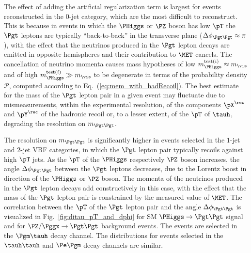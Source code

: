 The effect of adding the artificial regularization term is largest for events reconstructed in the $0$-jet category,
which are the most difficult to reconstruct.
This is because in events in which the $\PHiggs$ or $\PZ$ boson has low $\pT$
the $\Pgt$ leptons are typically ``back-to-back'' in the transverse plane ($\Delta\phi_{\Pgt\Pgt} \approx \pi$), 
with the effect that the neutrinos produced in the $\Pgt$ lepton decays are emitted in opposite hemispheres and their contribution to $\MET$ cancels.
The cancellation of neutrino momenta causes mass hypotheses of low $m_{\PHiggs}^{\textrm{test}(i)} \approx m_{\vis}$
and of high $m_{\PHiggs}^{\textrm{test}(i)} \gg m_{\vis}$
to be degenerate in terms of the probability density $\mathcal{P}$,
computed according to Eq.~(\ref{eq:mem_with_hadRecoil}).
The best estimate for the mass of the $\Pgt$ lepton pair in a given event may fluctuate 
due to mismeasurements, within the experimental resolution, of the components $\pX^{\rec}$ and $\pY^{\rec}$ of the hadronic recoil or, to a lesser extent, of the $\pT$ of $\tauh$,
degrading the resolution on $m_{\Pgt\Pgt}$.

The resolution on $m_{\Pgt\Pgt}$ is significantly higher 
in events selected in the $1$-jet and $2$-jet VBF categories,
in which the $\Pgt$ lepton pair typically recoils against high $\pT$ jets.
As the $\pT$ of the $\PHiggs$ respectively $\PZ$ boson increases,
the angle $\Delta\phi_{\Pgt\Pgt}$ between the $\Pgt$ leptons decreases, due to the Lorentz boost in direction of the $\PHiggs$ or $\PZ$ boson.
The momenta of the neutrinos produced in the $\Pgt$ lepton decays add constructively in this case,
with the effect that the mass of the $\Pgt$ lepton pair is constrained by the measured value of $\MET$.
The correlation between the $\pT$ of the $\Pgt$ lepton pair and the angle $\Delta\phi_{\Pgt\Pgt}$ is visualized in Fig.~\ref{fig:ditau_pT_and_dphi}
for SM $\PHiggs \to \Pgt\Pgt$ signal and for $\PZ/\Pggx \to \Pgt\Pgt$ background events.
The events are selected in the $\Pgm\tauh$ decay channel.
The distributions for events selected in the $\tauh\tauh$ and $\Pe\Pgm$ decay channels are similar.

